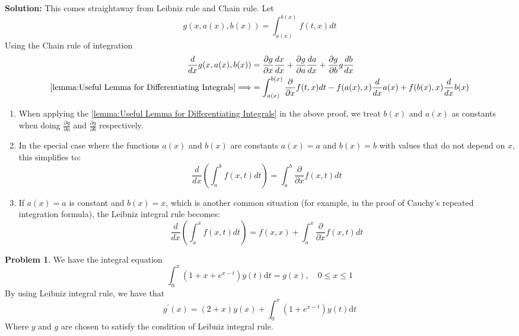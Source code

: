 \documentclass[14pt]{article}
\theoremstyle{definition}
\newtheorem{problem}[theorem]{Problem}
\newenvironment{solution}
{\color{C2}\begin{framed}\begingroup\textbf{Solution:} }
  {\endgroup\end{framed}}
\theoremstyle{remark}
\newenvironment{remark}
  {\pushQED{\qed}\renewcommand{\qedsymbol}{$\triangle$}\remarkx}
  {\popQED\endremarkx}
\begin{document}
\begin{solution}
    This comes straightaway from Leibniz rule and Chain rule. Let
    $$
        g(x, a(x), b(x))=\int_{a(x)}^{b(x)} f(t, x) d t
    $$
    Using the Chain rule of integration
    $$
        \begin{aligned}
            \frac{d}{d x} g(x, a(x), b(x))                                         & =\frac{\partial g}{\partial x}  \frac{d x}{d x}+\frac{\partial g}{\partial a} \frac{d a}{d x}+\frac{\partial g}{\partial b} g \frac{d b}{d x} \\
            \cref{lemma:Useful Lemma for Differentiating Integrals}\Longrightarrow & =\int_{a(x)}^{b(x)} \frac{\partial}{\partial x} f(t, x) d t-f(a(x), x) \frac{d}{d x} a(x)+f(b(x), x) \frac{d}{d x} b(x)
        \end{aligned}
    $$
\end{solution}
\begin{remark}\hfill
    \begin{enumerate}
        \item When applying the \cref{lemma:Useful Lemma for Differentiating Integrals} in the above proof, we treat $b(x)$ and $a(x)$ as constants when doing $\frac{\partial g}{\partial a}$ and $\frac{\partial g}{\partial b}$ respectively.
        \item In the special case where the functions $a(x)$ and $b(x)$ are constants $a(x)=a$ and $b(x)=b$ with values that do not depend on $x$, this simplifies to:
              $$
                  \frac{d}{d x}\left(\int_a^b f(x, t) d t\right)=\int_a^b \frac{\partial}{\partial x} f(x, t) d t
              $$
        \item If $a(x)=a$ is constant and $b(x)=x$, which is another common situation (for example, in the proof of Cauchy's repeated integration formula), the Leibniz integral rule becomes:
              $$
                  \frac{d}{d x}\left(\int_a^x f(x, t) d t\right)=f(x, x)+\int_a^x \frac{\partial}{\partial x} f(x, t) d t
              $$
    \end{enumerate}
\end{remark}
\begin{problem}
We have the integral equation
$$
    \int_0^x\left(1+x+e^{x-t}\right) y(t) \mathrm{d} t=g(x), \quad 0 \leq x \leq 1
$$
By using Leibniz integral rule, we have that
$$
    g^{\prime}(x)=(2+x) y(x)+\int_0^x\left(1+e^{x-t}\right) y(t) \mathrm{d} t
$$
Where $y$ and $g$ are chosen to satisfy the condition of Leibniz integral rule.
\end{problem}
\end{document}

